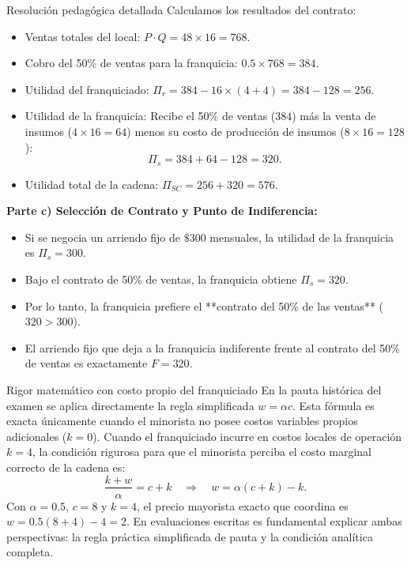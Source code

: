 \documentclass[11pt,a4paper]{article}
\begin{document}
\begin{pauta}{Resolución pedagógica detallada}
Calculamos los resultados del contrato:
\begin{itemize}[itemsep=2pt]
    \item Ventas totales del local: \(P \cdot Q = 48 \times 16 = 768\).
    \item Cobro del 50\% de ventas para la franquicia: \(0.5 \times 768 = 384\).
    \item Utilidad del franquiciado: \(\Pi_r = 384 - 16 \times (4 + 4) = 384 - 128 = 256\).
    \item Utilidad de la franquicia: Recibe el 50\% de ventas (\(384\)) más la venta de insumos (\(4 \times 16 = 64\)) menos su costo de producción de insumos (\(8 \times 16 = 128\)):
    \[
    \Pi_s = 384 + 64 - 128 = 320.
    \]
    \item Utilidad total de la cadena: \(\Pi_{SC} = 256 + 320 = 576\).
\end{itemize}

\textbf{Parte c) Selección de Contrato y Punto de Indiferencia:}
\begin{itemize}[itemsep=2pt]
    \item Si se negocia un arriendo fijo de \(\$300\) mensuales, la utilidad de la franquicia es \(\Pi_s = 300\).
    \item Bajo el contrato de 50\% de ventas, la franquicia obtiene \(\Pi_s = 320\).
    \item Por lo tanto, la franquicia prefiere el **contrato del 50\% de las ventas** (\(320 > 300\)).
    \item El arriendo fijo que deja a la franquicia indiferente frente al contrato del 50\% de ventas es exactamente \(F = 320\).
\end{itemize}
\end{pauta}

\begin{alerta}{Rigor matemático con costo propio del franquiciado}
En la pauta histórica del examen se aplica directamente la regla simplificada \(w = \alpha c\). Esta fórmula es exacta únicamente cuando el minorista no posee costos variables propios adicionales (\(k = 0\)). Cuando el franquiciado incurre en costos locales de operación \(k = 4\), la condición rigurosa para que el minorista perciba el costo marginal correcto de la cadena es:
\[
\frac{k + w}{\alpha} = c + k \quad\Rightarrow\quad \boxed{w = \alpha(c + k) - k.}
\]
Con \(\alpha = 0.5\), \(c = 8\) y \(k = 4\), el precio mayorista exacto que coordina es \(w = 0.5(8 + 4) - 4 = 2\). En evaluaciones escritas es fundamental explicar ambas perspectivas: la regla práctica simplificada de pauta y la condición analítica completa.
\end{alerta}
\end{document}
